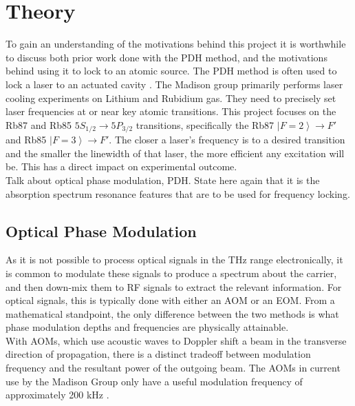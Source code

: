 \newpage
\section{Theory} \label{sec:theory}

To gain an understanding of the motivations behind this project it is worthwhile to discuss both prior work done with the PDH method, and the motivations behind using it to lock to an atomic source.  The PDH method is often used to lock a laser to an actuated cavity \cite{black1998}.  The Madison group primarily performs laser cooling experiments on Lithium and Rubidium gas.  They need to precisely set laser frequencies at or near key atomic transitions. This project focuses on the Rb87 and Rb85 $5S_{1/2} \rightarrow 5P_{3/2}$ transitions, specifically the Rb87 $\left|F=2\right\rangle \rightarrow F'$ and Rb85 $\left|F=3\right\rangle \rightarrow F'$.  The closer a laser's frequency is to a desired transition and the smaller the linewidth of that laser, the more efficient any excitation will be.  This has a direct impact on experimental outcome. \\

Talk about optical phase modulation, PDH. State here again that it is the absorption spectrum resonance features that are to be used for frequency locking.


\subsection{Optical Phase Modulation}

As it is not possible to process optical signals in the THz range electronically, it is common to modulate these signals to produce a spectrum about the carrier, and then down-mix them to RF signals to extract the relevant information. For optical signals, this is typically done with either an AOM or an EOM. From a mathematical standpoint, the only difference between the two methods is what phase modulation depths and frequencies are physically attainable. \\

With AOMs, which use acoustic waves to Doppler shift a beam in the transverse direction of propagation, there is a distinct tradeoff between modulation frequency and the resultant power of the outgoing beam.  The AOMs in current use by the Madison Group only have a useful modulation frequency of approximately 200 kHz \cite{madison14}. \\

